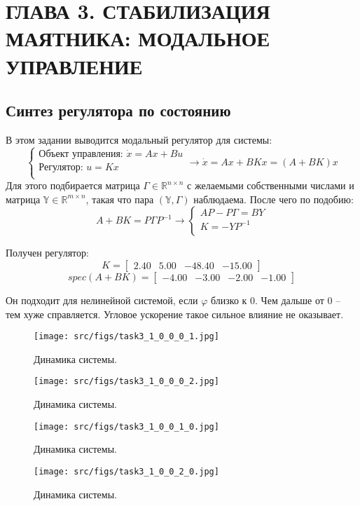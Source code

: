 \section{ГЛАВА 3. СТАБИЛИЗАЦИЯ МАЯТНИКА: МОДАЛЬНОЕ УПРАВЛЕНИЕ}

\subsection{Синтез регулятора по состоянию}
В этом задании выводится модальный регулятор для системы:
\[
        \begin{cases}
                \text{Объект управления: }\dot{x} = A x + Bu \\
                \text{Регулятор: }u = K x \\
        \end{cases} \rightarrow
        \dot{x} = A x + BKx = (A+BK)x
\]
Для этого подбирается матрица \(\Gamma \in \mathds{R}^{n \times n}\) с желаемыми собственными числами и матрица \(\mathds{Y} \in \mathds{R}^{m \times n}\), такая что пара \((\mathds{Y}, \Gamma)\) наблюдаема. После чего по подобию:
\[A+BK = P \Gamma P^{-1} \rightarrow
        \begin{cases}
                AP - P\Gamma = BY \\
                K = -YP^{-1} \\
        \end{cases}
\]

Получен регулятор:
\[K = \begin{bmatrix}
        2.40 &  5.00 & -48.40 & -15.00
      \end{bmatrix}\]
\[spec(A + B K) = \begin{bmatrix}
-4.00 & -3.00 & -2.00 & -1.00
\end{bmatrix}\]

Он подходит для нелинейной системой, если \(\varphi\) близко к 0. Чем дальше от 0 -- тем хуже справляется. Угловое ускорение такое сильное влияние не оказывает.
\begin{figure}[ht!]
  \centering
  \texttt{[image: src/figs/task3\_1\_0\_0\_0\_1.jpg]}
  \caption{Динамика системы.}
  \label{fig:task3_1_0_0_0_1.jpg}
\end{figure}
\begin{figure}[ht!]
        \centering
        \texttt{[image: src/figs/task3\_1\_0\_0\_0\_2.jpg]}
        \caption{Динамика системы.}
        \label{fig:task3_1_0_0_0_2.jpg}
\end{figure}
\begin{figure}[ht!]
        \centering
        \texttt{[image: src/figs/task3\_1\_0\_0\_1\_0.jpg]}
        \caption{Динамика системы.}
        \label{fig:task3_1_0_0_1_0.jpg}
\end{figure}
\begin{figure}[ht!]
        \centering
        \texttt{[image: src/figs/task3\_1\_0\_0\_2\_0.jpg]}
        \caption{Динамика системы.}
        \label{fig:task3_1_0_0_2_0.jpg}
\end{figure}
\FloatBarrier

